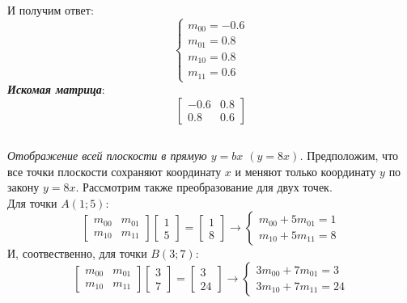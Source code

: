 \documentclass[a5paper, 10pt]{article}
\theoremstyle{definition}
\theoremstyle{plain}
\theoremstyle{remark}
\begin{document}
И получим ответ:
\begin{equation}
\begin{cases}
m_{0 0} = -0.6\\
m_{0 1} = 0.8\\
m_{1 0} = 0.8\\
m_{1 1} = 0.6
\end{cases}
\end{equation}
\textit{\textbf{Искомая матрица}}:
\begin{equation}
\begin{bmatrix}
-0.6 & 0.8\\
0.8 & 0.6
\end{bmatrix}
\end{equation}

\subsection{}
\textit{Отображение всей плоскости в прямую $y=bx$  $(y=8x)$.}
Предположим, что все точки плоскости сохраняют координату $x$ и меняют только координату $y$ по закону $y=8x$. Рассмотрим также преобразование для двух точек.\\
Для точки $A (1; 5)$:
\begin{equation}
\begin{bmatrix}
m_{0 0} & m_{0 1}\\
m_{1 0} & m_{1 1}
\end{bmatrix}
\begin{bmatrix}
1\\
5
\end{bmatrix}
=
\begin{bmatrix}
1\\
8
\end{bmatrix}
\to
\begin{cases}
m_{0 0} +  5m_{0 1} = 1\\
m_{1 0} + 5 m_{1 1} = 8
\end{cases}
\end{equation}
И, соотвественно, для точки $B(3;7)$:
\begin{equation}
\begin{bmatrix}
m_{0 0} & m_{0 1}\\
m_{1 0} & m_{1 1}
\end{bmatrix}
\begin{bmatrix}
3\\
7
\end{bmatrix}
=
\begin{bmatrix}
3\\
24
\end{bmatrix}
\to
\begin{cases}
3m_{0 0} +  7m_{0 1} = 3\\
3m_{1 0} + 7m_{1 1} = 24
\end{cases}
\end{equation}
\end{document}
